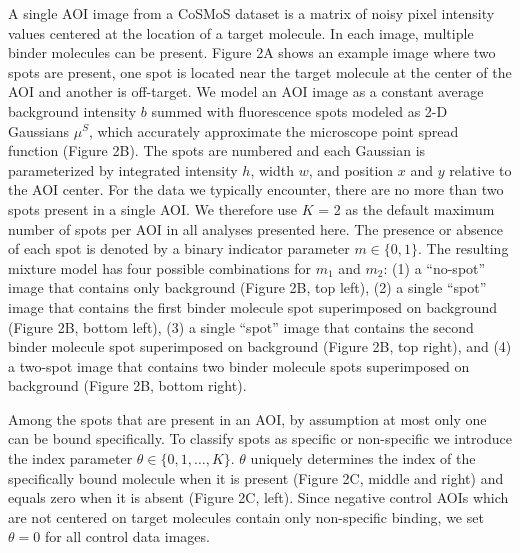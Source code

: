 A single AOI image from a CoSMoS dataset is a matrix of noisy pixel intensity values centered at the location of a target molecule. In each image, multiple binder molecules can be present. Figure 2A shows an example image where two spots are present, one spot is located near the target molecule at the center of the AOI and another is off-target. We model an AOI image as a constant average background intensity $b$ summed with fluorescence spots modeled as 2-D Gaussians $\mu^S$, which accurately approximate the microscope point spread function \cite{Zhang2007-rb} (Figure 2B). The spots are numbered and each Gaussian is parameterized by integrated intensity $h$, width $w$, and position $x$ and $y$ relative to the AOI center. For the data we typically encounter, there are no more than two spots present in a single AOI. We therefore use $K$ = 2 as the default maximum  number of spots per AOI in all analyses presented here. The presence or absence of each spot is denoted by a binary indicator parameter $m \in \{0, 1\}$. The resulting mixture model has four possible combinations for $m_1$ and $m_2$: (1) a “no-spot” image that contains only background (Figure 2B, top left), (2) a single “spot” image that contains the first binder molecule spot superimposed on background (Figure 2B, bottom left), (3) a single “spot” image that contains the second binder molecule spot superimposed on background (Figure 2B, top right), and (4) a two-spot image that contains two binder molecule spots superimposed on background (Figure 2B, bottom right).  %

Among the spots that are present in an AOI, by assumption at most only one can be bound specifically. To classify spots as specific or non-specific we introduce the index parameter $\theta \in \{0,1,\dots,K\}$. $\theta$ uniquely determines the index of the specifically bound molecule when it is present (Figure 2C, middle and right) and equals zero when it is absent (Figure 2C, left). Since negative control AOIs which are not centered on target molecules contain only non-specific binding, we set $\theta = 0$ for all control data images. 

